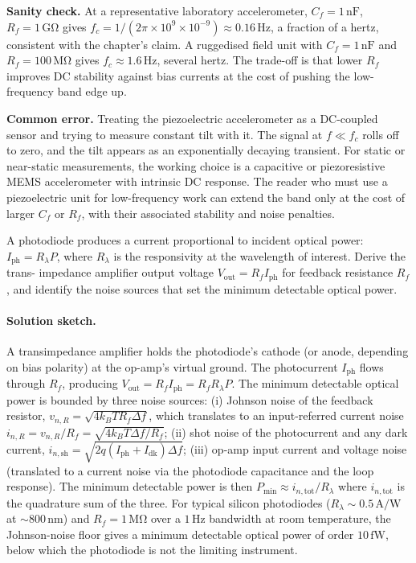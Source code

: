 \textbf{Sanity check.} At a representative laboratory
accelerometer, $C_{f} = 1 \,\si{\nano\farad}$, $R_{f} = 1 \,\si
{\giga\ohm}$ gives $f_{c} = 1/(2\pi \times 10^{9} \times 10^{-9})
\approx 0.16 \,\si{\hertz}$, a fraction of a hertz, consistent
with the chapter's claim. A ruggedised field unit with $C_{f} =
1 \,\si{\nano\farad}$ and $R_{f} = 100 \,\si{\mega\ohm}$ gives
$f_{c} \approx 1.6 \,\si{\hertz}$, several hertz. The trade-off
is that lower $R_{f}$ improves DC stability against bias currents
at the cost of pushing the low-frequency band edge up.

\textbf{Common error.} Treating the piezoelectric accelerometer
as a DC-coupled sensor and trying to measure constant tilt with
it. The signal at $f \ll f_{c}$ rolls off to zero, and the tilt
appears as an exponentially decaying transient. For static or
near-static measurements, the working choice is a capacitive or
piezoresistive MEMS accelerometer with intrinsic DC response.
The reader who must use a piezoelectric unit for low-frequency
work can extend the band only at the cost of larger $C_{f}$ or
$R_{f}$, with their associated stability and noise penalties.

\begin{exercise}
A photodiode produces a current proportional to incident optical
power: $I_{\text{ph}} = R_{\lambda} P$, where $R_{\lambda}$ is the
responsivity at the wavelength of interest. Derive the trans-
impedance amplifier output voltage $V_{\text{out}} = R_{f} I_{\text
{ph}}$ for feedback resistance $R_{f}$, and identify the noise
sources that set the minimum detectable optical power.
\end{exercise}

\paragraph{Solution sketch.} A transimpedance amplifier holds the
photodiode's cathode (or anode, depending on bias polarity) at the
op-amp's virtual ground. The photocurrent $I_{\text{ph}}$ flows
through $R_{f}$, producing
$V_{\text{out}} = R_{f} I_{\text{ph}} = R_{f} R_{\lambda} P$. The
minimum detectable optical power is bounded by three noise sources:
(i) Johnson noise of the feedback resistor,
$v_{n,R} = \sqrt{4 k_{B} T R_{f} \Delta f}$, which translates to an
input-referred current noise
$i_{n,R} = v_{n,R}/R_{f} = \sqrt{4 k_{B} T \Delta f / R_{f}}$;
(ii) shot noise of the photocurrent and any dark current,
$i_{n,\text{sh}} = \sqrt{2 q (I_{\text{ph}} + I_{\text{dk}})
\Delta f}$; (iii) op-amp input current and voltage noise
(translated to a current noise via the photodiode capacitance and
the loop response). The minimum detectable power is then
$P_{\min} \approx i_{n,\text{tot}}/R_{\lambda}$ where
$i_{n,\text{tot}}$ is the quadrature sum of the three. For typical
silicon photodiodes ($R_{\lambda} \sim 0.5 \,\si{\ampere\per\watt}$
at $\sim 800 \,\si{\nano\meter}$) and $R_{f} = 1 \,\si{\mega\ohm}$
over a $1 \,\si{\hertz}$ bandwidth at room temperature, the
Johnson-noise floor gives a minimum detectable optical power of
order $10 \,\si{\femto\watt}$, below which the photodiode is not
the limiting instrument.


